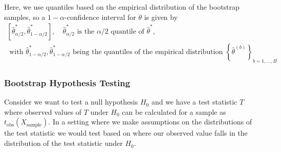 Here, we use quantiles based on the empirical distribution of the bootstrap samples, so a $1-\alpha$-confidence interval for $\theta$ is given by
\begin{equation}
    \begin{multlined}
        \left[ \hat{\theta}^*_{\alpha/2}, \hat{\theta}^*_{1 - \alpha/2} \right], \quad \hat{\theta}^*_{\alpha/2} \text{ is the } \alpha/2 \text{ quantile of } \hat{\theta}^*, \\
        \text{ with } \hat{\theta}^*_{1 - \alpha/2}, \hat{\theta}^*_{1 - \alpha/2} \text{ being the quantiles of the empirical distribution } \left\{ \hat{\theta}^{(b)} \right\}_{b=1,\dots,B}
    \end{multlined}
\end{equation}


\subsubsection{Bootstrap Hypothesis Testing}
\label{subsec:bootstrap_hypothesis_testing}

Consider we want to test a null hypothesis $H_0$ and we have a test statistic $T$ where observed values of $T$ under $H_0$ can be calculated for
a sample as $t_{\text{obs}}\left( X_{\text{sample}} \right)$. In a setting where we make assumptions on the distributions
of the test statistic we would test based on where our observed value falls in the distribution of the test statistic under $H_0$.


